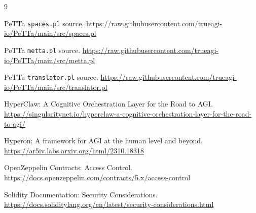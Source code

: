 \documentclass[11pt]{article}
\newcommand{\code}[1]{\texttt{#1}}
\begin{document}
\begin{thebibliography}{9}

PeTTa \code{spaces.pl} source.\newline
\url{https://raw.githubusercontent.com/trueagi-io/PeTTa/main/src/spaces.pl}

PeTTa \code{metta.pl} source.\newline
\url{https://raw.githubusercontent.com/trueagi-io/PeTTa/main/src/metta.pl}

PeTTa \code{translator.pl} source.\newline
\url{https://raw.githubusercontent.com/trueagi-io/PeTTa/main/src/translator.pl}

HyperClaw: A Cognitive Orchestration Layer for the Road to AGI.\newline
\url{https://singularitynet.io/hyperclaw-a-cognitive-orchestration-layer-for-the-road-to-agi/}

Hyperon: A framework for AGI at the human level and beyond.\newline
\url{https://ar5iv.labs.arxiv.org/html/2310.18318}

OpenZeppelin Contracts: Access Control.\newline
\url{https://docs.openzeppelin.com/contracts/5.x/access-control}

Solidity Documentation: Security Considerations.\newline
\url{https://docs.soliditylang.org/en/latest/security-considerations.html}

\end{thebibliography}
\end{document}
